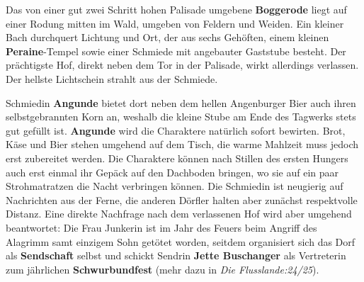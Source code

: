 \neuespalte


Das von einer gut zwei Schritt hohen Palisade umgebene \textbf{Boggerode} liegt auf einer Rodung mitten im Wald, umgeben von Feldern und Weiden.
Ein kleiner Bach durchquert Lichtung und Ort, der aus sechs Gehöften, einem kleinen \textbf{Peraine}-Tempel sowie einer Schmiede mit angebauter Gaststube besteht.
Der prächtigste Hof, direkt neben dem Tor in der Palisade, wirkt allerdings verlassen.
Der hellste Lichtschein strahlt aus der Schmiede.
\begin{center}
\end{center}

Schmiedin \textbf{Angunde} bietet dort neben dem hellen Angenburger Bier auch ihren selbstgebrannten Korn an, weshalb die kleine Stube am Ende des Tagwerks stets gut gefüllt ist.
\textbf{Angunde} wird die Charaktere natürlich sofort bewirten.
Brot, Käse und Bier stehen umgehend auf dem Tisch, die warme Mahlzeit muss jedoch erst zubereitet werden.
Die Charaktere können nach Stillen des ersten Hungers auch erst einmal ihr Gepäck auf den Dachboden bringen, wo sie auf ein paar Strohmatratzen die Nacht verbringen können.
Die Schmiedin ist neugierig auf Nachrichten aus der Ferne, die anderen Dörfler halten aber zunächst respektvolle Distanz.
Eine direkte Nachfrage nach dem verlassenen Hof wird aber umgehend beantwortet:
Die Frau Junkerin ist im Jahr des Feuers beim Angriff des Alagrimm samt einzigem Sohn getötet worden, seitdem organisiert sich das Dorf als \textbf{Sendschaft} selbst und schickt Sendrin \textbf{Jette Buschanger} als Vertreterin zum jährlichen \textbf{Schwurbundfest} (mehr dazu in \emph{Die Flusslande:24/25}).


